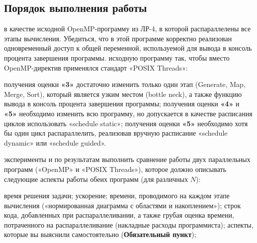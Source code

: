 { %
	\subsection{Порядок выполнения работы}
	\begin{enumerate}
		 в качестве исходной OpenMP-программу из ЛР-4, в которой распараллелены все этапы вычисления. Убедиться, что в этой программе корректно реализован одновременный доступ к общей переменной, используемой для вывода в консоль процента завершения программы.
		 исходную программу так, чтобы вместо OpenMP-директив применялся стандарт «POSIX Threads»:
			\begin{itemize}
				 получения оценки \textbf{«3»} достаточно изменить только один этап (Generate, Map, Merge, Sort), который является узким местом (bottle neck), а также функцию вывода в консоль процента завершения программы;
				 получения оценки \textbf{«4»} и \textbf{«5»} необходимо изменить всю программу, но допускается в качестве расписания циклов использовать «schedule static»;
				 получения оценки \textbf{«5»} необходимо хотя бы один цикл распараллелить, реализовав вручную расписание «schedule dynamic» или «schedule guided».
			\end{itemize}
		 эксперименты и по результатам выполнить сравнение работы двух параллельных программ («OpenMP» и «POSIX Threads»), которое должно описывать следующие аспекты работы обеих программ (для различных $N$):
			\begin{itemize}
				 время решения задачи;
				\itemпараллельное ускорение;
				 времени, проводимого на каждом этапе вычисления («нормированная
диаграмма с областями и накоплением»);
				 строк кода, добавленных при распараллеливании, а также грубая оценка
времени, потраченного на распараллеливание (накладные расходы программиста);
				 аспекты, которые вы выяснили самостоятельно (\textbf{Обязательный пункт});
			\end{itemize}
	\end{enumerate}
}
